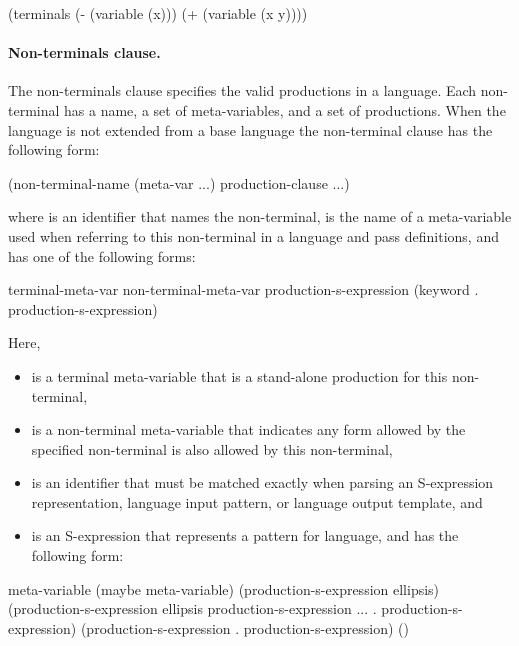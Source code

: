 \documentclass[letterpaper,10pt]{article}
\begin{document}
\begin{schemedisplay}
(terminals
  (- (variable (x)))
  (+ (variable (x y))))
\end{schemedisplay}

\paragraph{Non-terminals clause.}
The non-terminals clause specifies the valid productions in a language.
Each non-terminal has a name, a set of meta-variables, and a set of
productions.
When the language is not extended from a base language the non-terminal clause
has the following form:

\begin{schemedisplay}
(non-terminal-name (meta-var ...)
  production-clause
  ...)
\end{schemedisplay}

where  is an identifier that names the non-terminal,
 is the name of a meta-variable used when referring to this
non-terminal in a language and pass definitions, and 
has one of the following forms:

\begin{schemedisplay}
terminal-meta-var
non-terminal-meta-var
production-s-expression
(keyword . production-s-expression)
\end{schemedisplay}

Here,
\begin{itemize}
\item {} is a terminal meta-variable that is a stand-alone
production for this non-terminal,
\item {} is a non-terminal meta-variable that
indicates any form allowed by the specified non-terminal is also allowed by
this non-terminal,
\item {} is an identifier that must be matched exactly when parsing
an S-expression representation, language input pattern, or language output
template, and
\item {} is an S-expression that represents a
pattern for language, and has the following form:
\end{itemize}

\begin{schemedisplay}
meta-variable
(maybe meta-variable)
(production-s-expression ellipsis)
(production-s-expression ellipsis production-s-expression ... . production-s-expression)
(production-s-expression . production-s-expression)
() 
\end{schemedisplay}
\end{document}
